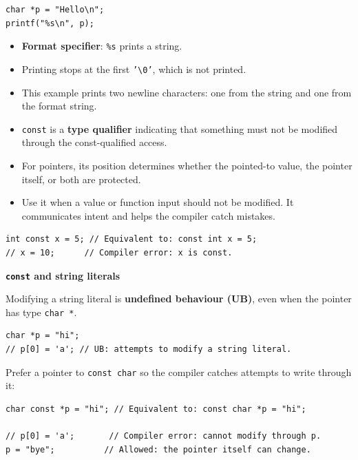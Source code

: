 \documentclass[11pt,a4paper]{article}
\begin{document}

\begin{lstlisting}[style=cscode]
char *p = "Hello\n";
printf("%s\n", p);
\end{lstlisting}

\begin{itemize}
    \item \textbf{Format specifier}: \texttt{\%s} prints a string.
    \item Printing stops at the first
          \texttt{'\textbackslash0'}, which is not printed.
    \item This example prints two newline characters: one from
          the string and one from the format string.
\end{itemize}


\begin{itemize}
    \item \texttt{const} is a \textbf{type qualifier} indicating
          that something must not be modified through the
          const-qualified access.
    \item For pointers, its position determines whether the
          pointed-to value, the pointer itself, or both are
          protected.
    \item Use it when a value or function input should not be
          modified. It communicates intent and helps the compiler
          catch mistakes.
\end{itemize}

\begin{lstlisting}[style=cscode]
int const x = 5; // Equivalent to: const int x = 5;
// x = 10;      // Compiler error: x is const.
\end{lstlisting}

\textbf{\texttt{const} and string literals}

Modifying a string literal is \textbf{undefined behaviour (UB)},
even when the pointer has type \texttt{char *}.

\begin{lstlisting}[style=cscode]
char *p = "hi";
// p[0] = 'a'; // UB: attempts to modify a string literal.
\end{lstlisting}

Prefer a pointer to \texttt{const char} so the compiler catches
attempts to write through it:

\begin{lstlisting}[style=cscode]
char const *p = "hi"; // Equivalent to: const char *p = "hi";

// p[0] = 'a';       // Compiler error: cannot modify through p.
p = "bye";          // Allowed: the pointer itself can change.
\end{lstlisting}
\end{document}

